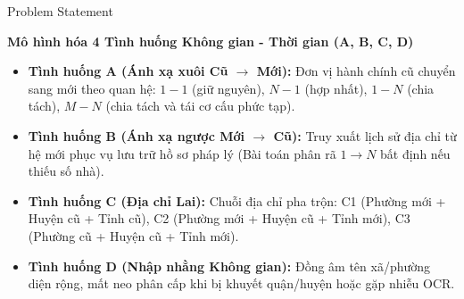 \documentclass[aspectratio=169,9pt]{beamer}
\begin{document}
\begin{frame}{Problem Statement}
  \vspace{0.05cm}
  \centerline{\large\textbf{Mô hình hóa 4 Tình huống Không gian - Thời gian (A, B, C, D)}}
  \vspace{0.25cm}

  \begin{itemize}
    \setlength{\itemsep}{7pt}
    \item \textbf{Tình huống A (Ánh xạ xuôi Cũ $\to$ Mới):} Đơn vị hành chính cũ chuyển sang mới theo quan hệ: $1 - 1$ (giữ nguyên), $N - 1$ (hợp nhất), $1 - N$ (chia tách), $M - N$ (chia tách và tái cơ cấu phức tạp).
    \item \textbf{Tình huống B (Ánh xạ ngược Mới $\to$ Cũ):} Truy xuất lịch sử địa chỉ từ hệ mới phục vụ lưu trữ hồ sơ pháp lý (Bài toán phân rã $1 \to N$ bất định nếu thiếu số nhà).
    \item \textbf{Tình huống C (Địa chỉ Lai):} Chuỗi địa chỉ pha trộn: C1 (Phường mới + Huyện cũ + Tỉnh cũ), C2 (Phường mới + Huyện cũ + Tỉnh mới), C3 (Phường cũ + Huyện cũ + Tỉnh mới).
    \item \textbf{Tình huống D (Nhập nhằng Không gian):} Đồng âm tên xã/phường diện rộng, mất neo phân cấp khi bị khuyết quận/huyện hoặc gặp nhiễu OCR.
  \end{itemize}
\end{frame}
\end{document}
